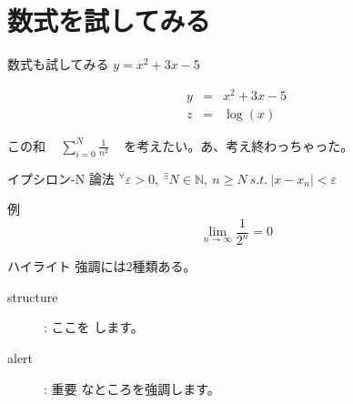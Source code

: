 \documentclass[dvipdfmx]{beamer}  %
\begin{document}
\section{数式を試してみる}
\begin{frame}{数式も試してみる}
  $y = x^2 + 3x -5$

  \begin{eqnarray*}
    y &=& x^2 + 3x -5 \\
    z &=& \log(x)
  \end{eqnarray*}

  この和 ~ $ {\displaystyle
    \sum_{i=0}^{N} \frac{1}{n^2}
  } $ ~ を考えたい。あ、考え終わっちゃった。

  \begin{block}{ イプシロン-N 論法 }
    $ {\displaystyle
      {}^{\forall} \varepsilon > 0, ~ {}^{\exists} N \in \mathbb{N}, ~ n \geq N ~
      s.t. ~ | x - x_n | < \varepsilon
    } $
  \end{block}

  \begin{exampleblock}{例}
    \begin{displaymath}
      \lim_{n \rightarrow \infty} \frac{1}{2^n} = 0
    \end{displaymath}
  \end{exampleblock}

\end{frame}

\begin{frame}{ハイライト}
  強調には2種類ある。

  \begin{description}
    \item[structure]: ここを  します。
    \item[alert]: \alert{重要} なところを強調します。
  \end{description}
\end{frame}
\end{document}
